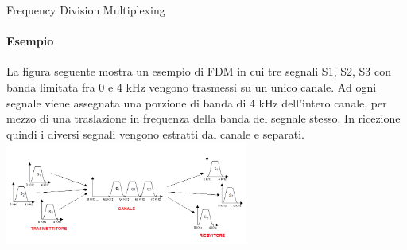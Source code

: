 \documentclass[aspectratio=169]{beamer}
\begin{document}
\begin{frame}{Frequency Division Multiplexing}
	\framesubtitle{Esempio}
	La figura seguente mostra un esempio di FDM in cui tre segnali S1, S2, S3 con banda limitata fra 0 e 4 kHz vengono trasmessi su un unico canale. Ad ogni segnale viene assegnata una porzione di banda di 4 kHz dell'intero canale, per mezzo di una traslazione in frequenza della banda del segnale stesso. In ricezione quindi i diversi segnali vengono estratti dal canale e separati.\\
	\smallskip
	\centering
		\includegraphics[width=0.6\textwidth]{Imgs/FDM}
	\end{frame}
\end{document}
